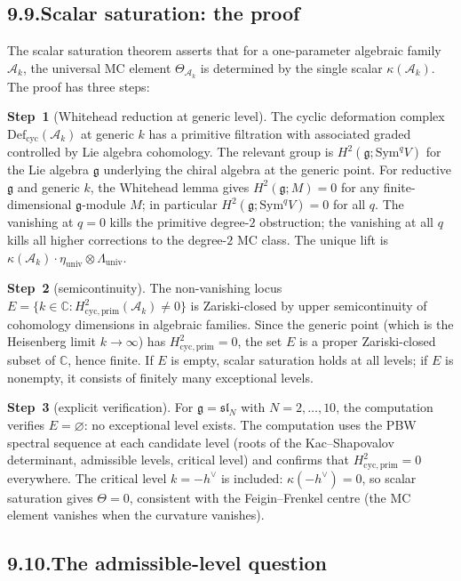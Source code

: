\documentclass[11pt,reqno]{amsart}
\theoremstyle{definition}
\theoremstyle{remark}
\providecommand{\cA}{\mathcal{A}}
\providecommand{\Defcyc}{\mathrm{Def}_{\mathrm{cyc}}}
\providecommand{\Sym}{\mathrm{Sym}}
\providecommand{\fg}{\mathfrak{g}}
\providecommand{\bC}{\mathbb{C}}
\providecommand{\Defcyc}{\mathrm{Def}_{\mathrm{cyc}}}
\numberwithin{equation}{section}
\begin{document}
\subsection*{9.9.\enspace Scalar saturation: the proof}

The scalar saturation theorem asserts that for a one-parameter
algebraic family $\cA_k$, the universal MC element
$\Theta_{\cA_k}$ is determined by the single scalar
$\kappa(\cA_k)$. The proof has three steps:

\medskip\noindent\textbf{Step~1} (Whitehead reduction at generic
level). The cyclic deformation complex $\Defcyc(\cA_k)$ at
generic $k$ has a primitive filtration with associated graded
controlled by Lie algebra cohomology. The relevant group is
$H^2(\fg; \Sym^q V)$ for the Lie algebra $\fg$ underlying the
chiral algebra at the generic point. For reductive $\fg$ and
generic $k$, the Whitehead lemma gives $H^2(\fg; M) = 0$ for
any finite-dimensional $\fg$-module $M$; in particular
$H^2(\fg; \Sym^q V) = 0$ for all $q$. The vanishing at
$q = 0$ kills the primitive degree-$2$ obstruction; the
vanishing at all $q$ kills all higher corrections to the
degree-$2$ MC class. The unique lift is $\kappa(\cA_k) \cdot
\eta_{\mathrm{univ}} \otimes \Lambda_{\mathrm{univ}}$.

\medskip\noindent\textbf{Step~2} (semicontinuity). The
non-vanishing locus
$E = \{k \in \bC : H^2_{\mathrm{cyc,prim}}(\cA_k) \neq 0\}$
is Zariski-closed by upper semicontinuity of cohomology
dimensions in algebraic families. Since the generic point (which
is the Heisenberg limit $k \to \infty$) has
$H^2_{\mathrm{cyc,prim}} = 0$, the set $E$ is a proper
Zariski-closed subset of $\bC$, hence finite. If $E$ is
empty, scalar saturation holds at all levels; if $E$ is
nonempty, it consists of finitely many exceptional levels.

\medskip\noindent\textbf{Step~3} (explicit verification).
For $\fg = \mathfrak{sl}_N$ with $N = 2, \ldots, 10$, the
computation verifies $E = \varnothing$: no exceptional level
exists. The computation uses the PBW spectral sequence at each
candidate level (roots of the Kac--Shapovalov determinant,
admissible levels, critical level) and confirms that
$H^2_{\mathrm{cyc,prim}} = 0$ everywhere. The critical level
$k = -h^\vee$ is included: $\kappa(-h^\vee) = 0$, so scalar
saturation gives $\Theta = 0$, consistent with the
Feigin--Frenkel centre (the MC element vanishes when the
curvature vanishes).

\subsection*{9.10.\enspace The admissible-level question}
\end{document}
